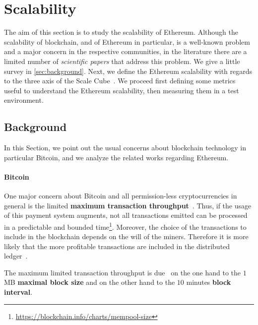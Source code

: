\section{Scalability}
\label{sec:scalability}
The aim of this section is to study the scalability of Ethereum. Although the
scalability of blockchain, and of Ethereum in particular, is a well-known
problem and a major concern in the respective communities, in the literature
there are a limited number of \emph{scientific papers} that address this
problem. We give a little survey in \autoref{sec:background}. Next, we define
the Ethereum scalability with regards to the three axis of the Scale
Cube~\cite{bib:art-of-scalability}. We proceed first defining some metrics
useful to understand the Ethereum scalability, then measuring them in a test
environment.


\subsection{Background}
\label{sec:background}

In this Section, we point out the usual concerns about blockchain technology in
particular Bitcoin, and we analyze the related works regarding Ethereum.

\paragraph{Bitcoin} One major concern about Bitcoin and all permission-less
cryptocurrencies in general is the limited \textbf{maximum transaction
throughput}~\cite{bib:blockchain-challenges-opportunites-survey, bib:taxonomy,
bib:scaling-croman}. Thus, if the usage of this payment system augments, not all
transactions emitted can be processed in a predictable and bounded
time\footnote{\url{https://blockchain.info/charts/mempool-size}}. Moreover, the
choice of the transactions to include in the blockchain depends on the will of
the miners. Therefore it is more likely that the more profitable transactions
are included in the distributed
ledger~\cite{bib:blockchain-challenges-opportunites-survey,wood2018ethereum}.

The maximum limited transaction throughput is due~\cite{bib:ghost,
bib:scaling-croman} on the one hand to the $1$ MB \textbf{maximal block size}
and on the other hand to the $10$ minutes \textbf{block interval}.

